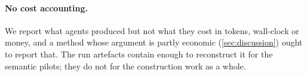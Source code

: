 \paragraph{No cost accounting.} We report what agents produced but not what they
cost in tokens, wall-clock or money, and a method whose argument is partly economic
(\cref{sec:discussion}) ought to report that. The run artefacts contain enough to
reconstruct it for the semantic pilots; they do not for the construction work as a
whole.
